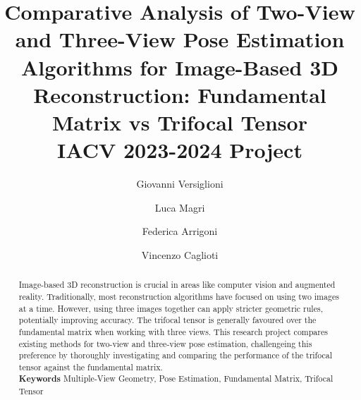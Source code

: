 \documentclass[11pt,letterpaper]{article}
\numberwithin{equation}{section}
\begin{document}
\title{Comparative Analysis of Two-View and Three-View Pose Estimation Algorithms for Image-Based 3D Reconstruction: Fundamental Matrix vs Trifocal Tensor \\ IACV 2023-2024 Project}

\author[1]{Giovanni Versiglioni}
\author[2]{Luca Magri}
\author[2]{Federica Arrigoni}
\author[2]{Vincenzo Caglioti}

\maketitle

\begin{abstract}
	Image-based 3D reconstruction is crucial in areas like computer vision and augmented reality. Traditionally, most reconstruction algorithms have focused on using two images at a time. However, using three images together can apply stricter geometric rules, potentially improving accuracy. The trifocal tensor is generally favoured over the fundamental matrix when working with three views. This research project compares existing methods for two-view and three-view pose estimation, challengeing this preference by thoroughly investigating and comparing the performance of the trifocal tensor against the fundamental matrix.\\
	
	\textbf{Keywords} Multiple-View Geometry, Pose Estimation, Fundamental Matrix, Trifocal Tensor
\end{abstract}

\begin{multicols}{2}
\tableofcontents
\end{multicols}

\pagebreak

\listoffigures

\vspace{10mm}

\listoftables

\vspace{10mm}

\listofalgorithms

\pagebreak
\end{document}
